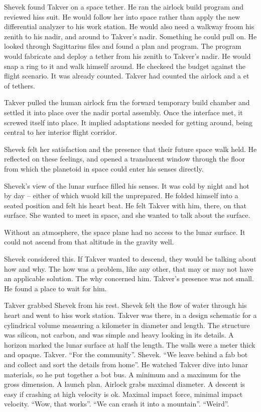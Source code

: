 Shevek found Takver on a space tether.  He ran the airlock build
program and reviewed hiss suit.  He would follow her into space rather
than apply the new differential analyzer to his work station.  He
would also need a walkway froom his zenith to his nadir, and around to
Takver's nadir.  Something he could pull on.  He looked through
Sagittarius files and found a plan and program.  The program would
fabricate and deploy a tether from his zenith to Takver's nadir.  He
would snap a ring to it and walk himself around.  He checkeed the
budget against the flight scenario.  It was already counted.  Takver
had counted the airlock and a et of tethers.

Takver pulled the human airlock frm the forward temporary build
chamber and settled it into place over the nadir portal assembly.
Once the interface met, it screwed itself into place.  It implied
adaptations needed for getting around, being central to her interior
flight corridor.

Shevek felt her satisfaction and the presence that their future space
walk held.  He reflected on these feelings, and opened a translucent
window through the floor from which the planetoid in space could enter
his senses directly.

Shevek's view of the lunar surface filled his senses.  It was cold by
night and hot by day -- either of which wuold kill the unprepared.  He
folded himself into a seated position and felt his heart beat.  He
felt Takver with him, there, on that surface.  She wanted to meet in
space, and she wanted to talk about the surface.

Without an atmosphere, the space plane had no access to the lunar
surface.  It could not ascend from that altitude in the gravity well.

Shevek considered this.  If Takver wanted to descend, they would be
talking about how and why.  The how was a problem, like any other,
that may or may not have an applicable solution.  The why concerned
him.  Takver's presence was not small.  He found a place to wait for
him.

Takver grabbed Shevek from his rest.  Shevek felt the flow of water
through his heart and went to hiss work station.  Takver was there, in
a design schematic for a cylindrical volume measuring a kilometer in
diameter and length.  The structure was silicon, not carbon, and was
simple and heavy looking in its details.  A horizon marked the lunar
surface at half the length.  The walls were a meter thick and opaque.
Takver.  ``For the community''.  Shevek.  ``We leave behind a fab bot
and collect and sort the details from home''.  He watched Takver dive
into lunar materials, so he put together a bot bus.  A minimum and a
maximum for the gross dimension.  A launch plan.  Airlock grabs
maximal diameter.  A descent is easy if crashing at high velocity is
ok.  Maximal impact force, minimal impact velocity.  ``Wow, that
works''.  ``We can crash it into a mountain''.  ``Weird''.

